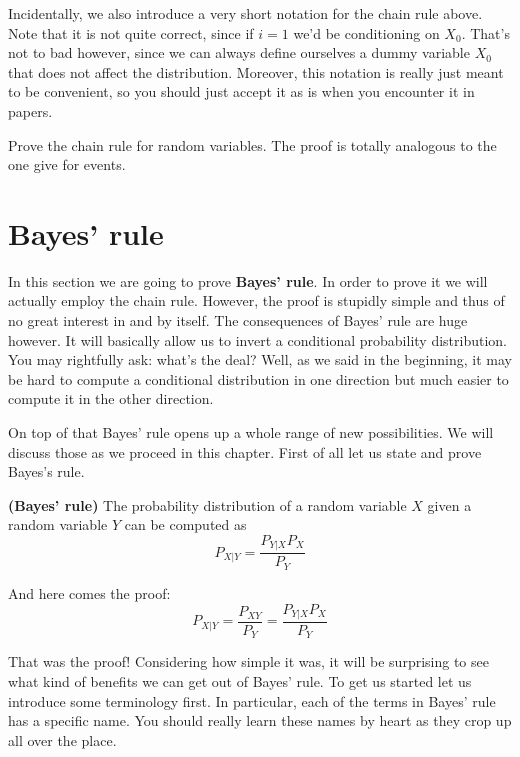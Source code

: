 Incidentally, we also introduce a very short notation for the chain rule above. Note that it is not quite correct, since if
$ i = 1 $ we'd be conditioning on $ X_{0} $. That's not to bad however, since we can always define ourselves a dummy variable
$ X_{0} $ that does not affect the distribution. Moreover, this notation is really just meant to be convenient, so you
should just accept it as is when you encounter it in papers.

\begin{Exercise}
Prove the chain rule for random variables. The proof is totally analogous to the one give for events.
\end{Exercise}

\section{Bayes' rule}

In this section we are going to prove \textbf{Bayes' rule}. In order to prove it we will actually employ the chain rule.
However, the proof is stupidly simple and thus of no great interest in and by itself. The consequences of Bayes' rule
are huge however. It will basically allow us to invert a conditional probability distribution. You may rightfully
ask: what's the deal? Well, as we said in the beginning, it may be hard to compute a conditional distribution in one
direction but much easier to compute it in the other direction.

On top of that Bayes' rule opens up a whole range of new possibilities. We will discuss those as we proceed in this
chapter. First of all let us state and prove Bayes's rule.
\begin{Theorem}{\textbf{(Bayes' rule)}}
The probability distribution of a random variable $ X $ given a random variable $ Y $ can be computed as
$$ P_{X|Y} = \dfrac{P_{Y|X}P_{X}}{P_{Y}} $$
\end{Theorem}

And here comes the proof:
\begin{equation}
P_{X|Y} = \dfrac{P_{XY}}{P_{Y}} = \dfrac{P_{Y|X}P_{X}}{P_{Y}}
\end{equation}

That was the proof! Considering how simple it was, it will be surprising to see what kind of benefits we can get out
of Bayes' rule. To get us started let us introduce some terminology first. In particular, each of the terms
in Bayes' rule has a specific name. You should really learn these names by heart as they crop up all over the place.


